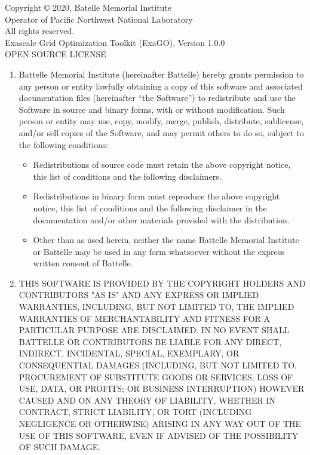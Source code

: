 \noindent
Copyright © 2020, Batelle Memorial Institute \\
Operator of Pacific Northwest National Laboratory \\
All rights reserved. \\
Exascale Grid Optimization Toolkit (ExaGO), Version 1.0.0 \\
OPEN SOURCE LICENSE \\

\noindent
\begin{enumerate}
\item Battelle Memorial Institute (hereinafter Battelle) hereby grants permission to any person or entity lawfully obtaining a copy of this software and associated documentation files (hereinafter “the Software”) to redistribute and use the Software in source and binary forms, with or without modification.  Such person or entity may use, copy, modify, merge, publish, distribute, sublicense, and/or sell copies of the Software, and may permit others to do so, subject to the following conditions:
\begin{itemize}
    \item Redistributions of source code must retain the above copyright notice, this list of conditions and the following disclaimers. 
   \item Redistributions in binary form must reproduce the above copyright notice, this list of conditions and the following disclaimer in the documentation and/or other materials provided with the distribution. 
   \item Other than as used herein, neither the name Battelle Memorial Institute or Battelle may be used in any form whatsoever without the express written consent of Battelle.
\end{itemize}  
\item THIS SOFTWARE IS PROVIDED BY THE COPYRIGHT HOLDERS AND CONTRIBUTORS "AS IS" AND ANY EXPRESS OR IMPLIED WARRANTIES, INCLUDING, BUT NOT LIMITED TO, THE IMPLIED WARRANTIES OF MERCHANTABILITY AND FITNESS FOR A PARTICULAR PURPOSE ARE DISCLAIMED. IN NO EVENT SHALL BATTELLE OR CONTRIBUTORS BE LIABLE FOR ANY DIRECT, INDIRECT, INCIDENTAL, SPECIAL, EXEMPLARY, OR CONSEQUENTIAL DAMAGES (INCLUDING, BUT NOT LIMITED TO, PROCUREMENT OF SUBSTITUTE GOODS OR SERVICES; LOSS OF USE, DATA, OR PROFITS; OR BUSINESS INTERRUPTION) HOWEVER CAUSED AND ON ANY THEORY OF LIABILITY, WHETHER IN CONTRACT, STRICT LIABILITY, OR TORT (INCLUDING NEGLIGENCE OR OTHERWISE) ARISING IN ANY WAY OUT OF THE USE OF THIS SOFTWARE, EVEN IF ADVISED OF THE POSSIBILITY OF SUCH DAMAGE.
\end{enumerate}

